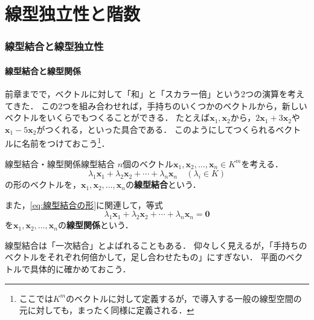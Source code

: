 \part{線型独立性と階数}

\begin{abstract}
  ベクトルの組の「無駄のなさ」を表す\textbf{線型独立性}を定義し，その基本性質を調べる．
  これを用いて行列の\textbf{階数}を定義し，連立一次方程式が解をもつための条件を与える．
\end{abstract}

\section{線型結合と線型独立性}

\subsection{線型結合と線型関係}

前章までで，ベクトルに対して「和」と「スカラー倍」という$2$つの演算を考えてきた．
この$2$つを組み合わせれば，手持ちのいくつかのベクトルから，新しいベクトルをいくらでもつくることができる．
たとえば$\bm{x}_1,\bm{x}_2$から，$2\bm{x}_1 + 3\bm{x}_2$や$\bm{x}_1 - 5\bm{x}_2$がつくれる，といった具合である．
このようにしてつくられるベクトルに名前をつけておこう\footnote{ここでは$K^m$のベクトルに対して定義するが，で導入する一般の線型空間の元に対しても，まったく同様に定義される．}．

\begin{definition}{線型結合・線型関係}{線型結合}
  $n$個のベクトル$\bm{x}_1, \bm{x}_2, \dots, \bm{x}_n \in K^m$を考える．
  \begin{equation}
    \lambda_1 \bm{x}_1 + \lambda_2 \bm{x}_2 + \cdots + \lambda_n \bm{x}_n
    \quad (\lambda_i \in K) \label{eq:線型結合の形}
  \end{equation}
  の形のベクトルを，$\bm{x}_1, \bm{x}_2, \dots, \bm{x}_n$の\textbf{線型結合}という．

  また，\eqref{eq:線型結合の形}に関連して，等式
  \[
    \lambda_1 \bm{x}_1 + \lambda_2 \bm{x}_2 + \cdots + \lambda_n \bm{x}_n = \bm{0}
  \]
  を$\bm{x}_1, \bm{x}_2, \dots, \bm{x}_n$の\textbf{線型関係}という．
\end{definition}

線型結合は「一次結合」とよばれることもある．
仰々しく見えるが，「手持ちのベクトルをそれぞれ何倍かして，足し合わせたもの」にすぎない．
平面のベクトルで具体的に確かめておこう．

